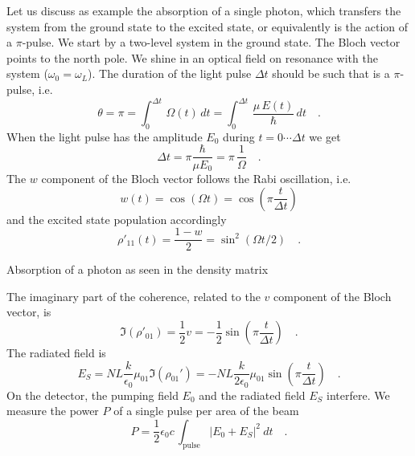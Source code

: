 Let us discuss as example the absorption of a single photon, which transfers the system from the ground state to the excited state, or equivalently is the action of a $\pi$-pulse. We start by a two-level system in the ground state. The Bloch vector points to the north pole. We shine in an optical field on resonance with the system ($\omega_0 = \omega_L$). The duration of the light pulse $\Delta t$ should be such that is a $\pi$-pulse, i.e.
\begin{equation}
 \theta = \pi = \int_0^{\Delta t} \, \Omega(t) \, dt =  \int_0^{\Delta t} \, \frac{ \mu \, E(t)}{\hbar} \, dt \quad .
\end{equation}
When the light pulse has the amplitude $E_0$ during $t= 0 \cdots \Delta t$ we get
\begin{equation}
 \Delta t = \pi \frac{\hbar}{\mu E_0}  = \pi \, \frac{1}{\Omega} \quad .
\end{equation} 
The $w$ component of the Bloch vector follows the Rabi oscillation, i.e.
\begin{equation}
 w(t) = \cos ( \Omega t  ) = \cos \left( \pi  \frac{t}{\Delta t} \right) 
\end{equation}
and the excited state population accordingly
\begin{equation}
 \rho'_{11}(t) = \frac{1 - w}{2}  = \sin^2 ( \Omega t /2 ) \quad .
\end{equation}
%
\begin{marginfigure}[-49mm]
\caption{Absorption of a photon as seen in the density matrix}
\label{fig:fid_rho_single_photon}
\end{marginfigure}
%
The imaginary part of the coherence, related to the $v$ component of the Bloch vector, is
\begin{equation}
 \Im (\rho'_{01} ) = \frac{1}{2} v =  - \frac{1}{2}  \sin \left( \pi \frac{t}{\Delta t} \right) \quad .
\end{equation}
The radiated field is 
\begin{equation}
 E_S  = N L \frac{k }{\epsilon_0}  \mu_{01} \Im (\rho_{01}' ) 
 = - N L \frac{k }{2 \epsilon_0}  \mu_{01} \sin \left( \pi \frac{t}{\Delta t} \right) \quad .
\end{equation}
On the detector, the pumping field $E_0$ and the radiated field $E_S$ interfere. We measure the power $P$ of a single pulse per area of the beam  
\begin{equation}
P  = \frac{1}{2} \epsilon_0 c \, \int_\text{pulse} | E_0 + E_S |^2 \ dt \quad .\label{eq:fid_P}
\end{equation}
